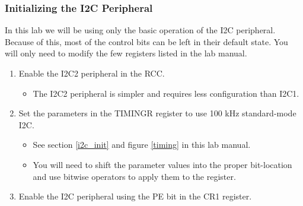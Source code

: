 \documentclass[openany,11pt,fleqn]{book} %
\begin{document}
\begin{exercise}
\subsubsection{Initializing the I2C Peripheral}
In this lab we will be using only the basic operation of the I2C peripheral. Because of this, most of the control bits can be left in their default state. You will only need to modify the few registers listed in the lab manual. 

\begin{enumerate}
    \item Enable the I2C2 peripheral in the RCC.
    \begin{itemize}
        \item The I2C2 peripheral is simpler and requires less configuration than I2C1.
    \end{itemize}
    \item Set the parameters in the TIMINGR register to use 100 kHz standard-mode I2C. 
    \begin{itemize}
        \item See section \ref{i2c_init} and figure \ref{timing} in this lab manual.
        \item You will need to shift the parameter values into the proper bit-location and use bitwise operators to apply them to the register. 
    \end{itemize}
    \item Enable the I2C peripheral using the PE bit in the CR1 register. 
\end{enumerate}
\end{exercise}
\end{document}
